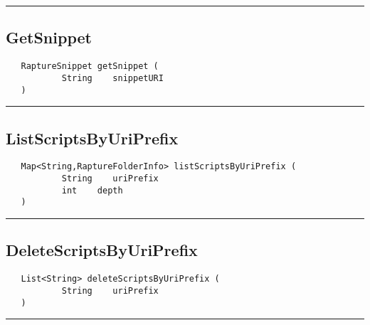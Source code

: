 \rule{15cm}{2pt}
\subsection{GetSnippet}
\label{Api:GetSnippet}
\begin{verbatim}
   RaptureSnippet getSnippet (
           String    snippetURI
   )
\end{verbatim}



\rule{15cm}{2pt}
\subsection{ListScriptsByUriPrefix}
\label{Api:ListScriptsByUriPrefix}
\begin{verbatim}
   Map<String,RaptureFolderInfo> listScriptsByUriPrefix (
           String    uriPrefix
           int    depth
   )
\end{verbatim}



\rule{15cm}{2pt}
\subsection{DeleteScriptsByUriPrefix}
\label{Api:DeleteScriptsByUriPrefix}
\begin{verbatim}
   List<String> deleteScriptsByUriPrefix (
           String    uriPrefix
   )
\end{verbatim}



\rule{15cm}{2pt}
